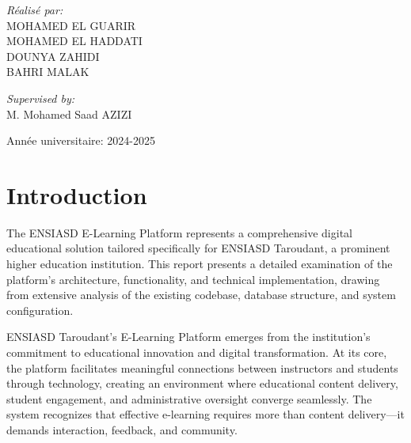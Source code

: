 \documentclass[12pt,a4paper]{article}
\begin{document}
\begin{titlepage}
\begin{center}
    \begin{minipage}[t]{0.45\textwidth}
      \begin{flushleft}
        {\Large \emph{Réalisé par:}}\\[0.2cm] %
        {\large 
          MOHAMED EL GUARIR \\[0.1cm] %
          MOHAMED EL HADDATI \\[0.1cm] %
          DOUNYA ZAHIDI \\[0.1cm] %
          BAHRI MALAK \\[0.1cm] %
        }
      \end{flushleft}
    \end{minipage}
    \hfill
    \begin{minipage}[t]{0.45\textwidth}
      \begin{flushright}
        {\Large \emph{Supervised by:}}\\[0.2cm] %
        {\large 
          M. Mohamed Saad AZIZI \\[0.1cm] %
        }
      \end{flushright}
    \end{minipage}

    \vspace*{3cm} %
    {\large Année universitaire: 2024-2025}
  \end{center}
\end{titlepage}

\tableofcontents
\newpage
\listoffigures

\section{Introduction}

The ENSIASD E-Learning Platform represents a comprehensive digital educational solution tailored specifically for ENSIASD Taroudant, a prominent higher education institution. This report presents a detailed examination of the platform's architecture, functionality, and technical implementation, drawing from extensive analysis of the existing codebase, database structure, and system configuration.

ENSIASD Taroudant's E-Learning Platform emerges from the institution's commitment to educational innovation and digital transformation. At its core, the platform facilitates meaningful connections between instructors and students through technology, creating an environment where educational content delivery, student engagement, and administrative oversight converge seamlessly. The system recognizes that effective e-learning requires more than content delivery—it demands interaction, feedback, and community.
\end{document}

